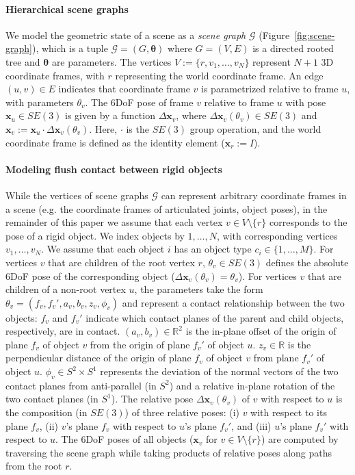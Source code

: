 \paragraph{Hierarchical scene graphs}
We model the geometric state of a scene as a \emph{scene graph} $\mathcal{G}$ (Figure~\ref{fig:scene-graph}), which is a tuple $\mathcal{G} = (G, \bm{\theta})$ where
$G = (V, E)$ is a directed rooted tree and $\bm\theta$ are parameters.
The vertices $V:= \{r,v_1,\ldots,v_N\}$ represent $N+1$ 3D coordinate frames, with $r$ representing the world coordinate frame. 
An edge $(u,v) \in E$ indicates that coordinate frame $v$ is parametrized relative to frame $u$, with parameters $\theta_v$.
The 6DoF pose of frame $v$ relative to frame $u$ with pose $\mathbf{x}_u \in SE(3)$ is given by a function $\Delta \mathbf{x}_v$, where $\Delta \mathbf{x}_v(\theta_v) \in SE(3)$ and  $\mathbf{x}_v := \mathbf{x}_u \cdot \Delta \mathbf{x}_v(\theta_v)$.
Here, $\cdot$ is the $SE(3)$ group operation, and the world coordinate frame is defined as the identity element ($\mathbf{x}_r := I$).


\paragraph{Modeling flush contact between rigid objects}
While the vertices of scene graphs $\mathcal{G}$ can represent arbitrary coordinate frames in a scene (e.g. the coordinate frames of articulated joints, object poses), in the remainder of this paper we assume that each vertex $v \in V \setminus \{r\}$ corresponds to the pose of a rigid object.
We index objects by $1, \ldots, N$, with corresponding vertices $v_1, \ldots, v_N$.
We assume that each object $i$ has an object type $c_i \in \{1, \ldots, M\}$.
For vertices $v$ that are children of the root vertex $r$, $\theta_v \in SE(3)$ defines the absolute 6DoF pose of the corresponding object ($\Delta \mathbf{x}_v(\theta_v) = \theta_v$). For vertices $v$ that are children of a non-root vertex $u$, the parameters take the form $\theta_v = (f_v, f_v', a_v, b_v, z_v, \phi_v)$ and represent a contact relationship between the two objects:
$f_v$ and $f_v'$ indicate which contact planes of the parent and child objects, respectively, are in contact.
$(a_v, b_v) \in \mathbb{R}^2$ is the in-plane offset of the origin of plane $f_v$ of object $v$ from the origin of plane $f_v'$ of object $u$.
$z_v \in \mathbb{R}$ is the perpendicular distance of the origin of plane $f_v$ of object $v$ from plane $f_v'$ of object $u$. $\phi_v \in S^2 \times S^1$ represents the deviation of the normal vectors of the two contact planes from anti-parallel (in $S^2$) and a relative in-plane rotation of the two contact planes (in $S^1$).
The relative pose $\Delta \mathbf{x}_v(\theta_v)$ of $v$ with respect to $u$ is the composition (in $SE(3)$) of three relative poses:
(i) $v$ with respect to its plane $f_v$, (ii) $v$'s plane $f_v$ with respect to $u$'s plane $f_v'$, and (iii) $u$'s plane $f_v'$ with respect to $u$.
The 6DoF poses of all objects ($\mathbf{x}_v$ for $v \in V \setminus \{r\}$) are computed by
traversing the scene graph while taking products of relative poses along paths from the root $r$.


